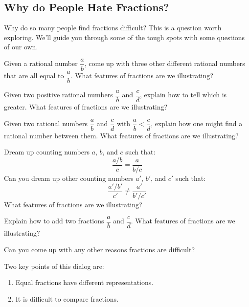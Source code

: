 \subsection{Why do People Hate Fractions?}

Why do so many people find fractions difficult? This is a question
worth exploring. We'll guide you through some of the tough spots with
some questions of our own.

\begin{question}
Given a rational number $\dfrac{a}{b}$, come up with three other different rational numbers
that are all equal to $\dfrac{a}{b}$. What features of fractions are we
illustrating?
\end{question}
\QM

\begin{question}
Given two positive rational numbers $\dfrac{a}{b}$ and $\dfrac{c}{d}$, explain how to tell which is greater. What features of fractions are we illustrating?
\end{question}
\QM

\begin{question} 
Given two rational numbers $\dfrac{a}{b}$ and $\dfrac{c}{d}$ with $\dfrac{a}{b} < \dfrac{c}{d}$, explain how one
might find a rational number between them. What features of fractions are we
illustrating?
\end{question}
\QM


\begin{question} 
Dream up counting numbers $a$, $b$, and $c$ such that:
\[
\frac{a/b}{c} = \frac{a}{b/c}
\]
Can you dream up other counting numbers $a'$, $b'$, and $c'$ such that:
\[
\frac{a'/b'}{c'} \neq \frac{a'}{b'/c'}
\]
What features of fractions are we illustrating?
\end{question}
\QM

\begin{question}
Explain how to add two fractions $\dfrac{a}{b}$ and $\dfrac{c}{d}$. What features of
fractions are we illustrating?
\end{question}
\QM


\begin{question} 
Can you come up with any other reasons fractions are difficult?
\end{question}
\QM

\begin{teachingnote}
Two key points of this dialog are: 
\begin{enumerate}
\item Equal fractions have different representations. 
\item It is difficult to compare fractions. 
\end{enumerate}
\end{teachingnote}





